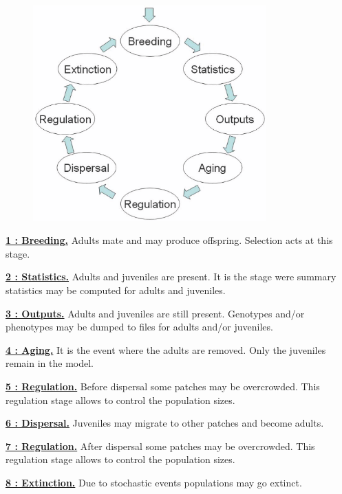 \documentclass[letterpaper,12pt,oneside]{book}
\begin{document}
\begin{figure}[h]
	\centering
		\includegraphics[width=0.80\textwidth]{life-cycle.pdf}
	\label{fig:life-cycle}
\end{figure}


\begin{description}
\item \textbf{\hyperref[1breeding]{1 : Breeding.}} Adults mate and may produce offspring. Selection acts at this stage.
\item \textbf{\hyperref[2statistics]{2 : Statistics.}} Adults and juveniles are present. It is the stage were summary statistics may be computed for adults and juveniles.
\item \textbf{\hyperref[3output]{3 : Outputs.}} Adults and juveniles are still present. Genotypes and/or phenotypes may be dumped to files for adults and/or juveniles.
\item \textbf{\hyperref[4aging]{4 : Aging.}} It is the event where the adults are removed. Only the juveniles remain in the model.
\item \textbf{\hyperref[5regulation]{5 : Regulation.}} Before dispersal some patches may be overcrowded. This regulation stage allows to control the population sizes.
\item \textbf{\hyperref[6dispersal]{6 : Dispersal.}} Juveniles may migrate to other patches and become adults. 
\item \textbf{\hyperref[7regulation]{7 : Regulation.}} After dispersal some patches may be overcrowded. This regulation stage allows to control the population sizes.
\item \textbf{\hyperref[8extinction]{8 : Extinction.}} Due to stochastic events populations may go extinct.
\end{description}
\end{document}
